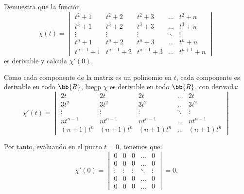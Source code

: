 \documentclass[12pt]{article}
\begin{document}
    \begin{ejercicio}
        Demuestra que la función
        \[
            \chi(t) = \begin{vmatrix}
                t^2+1 & t^2+2 & t^2+3 & \dots & t^2+n \\
                t^3+1 & t^3+2 & t^3+3 & \dots & t^3+n \\
                \vdots & \vdots & \vdots & \ddots & \vdots \\
                t^{n}+1 & t^{n}+2 & t^{n}+3 & \dots & t^{n}+n \\
                t^{n+1}+1 & t^{n+1}+2 & t^{n+1}+3 & \dots & t^{n+1}+n
            \end{vmatrix}
        \]
        es derivable y calcula $\chi'(0)$.

        Como cada componente de la matriz es un polinomio en $t$, cada componente es derivable en todo $\bb{R}$, luegp $\chi$ es derivable en todo $\bb{R}$, con derivada:
        \[
            \chi'(t) = \begin{vmatrix}
                2t & 2t & 2t & \dots & 2t \\
                3t^2 & 3t^2 & 3t^2 & \dots & 3t^2 \\
                \vdots & \vdots & \vdots & \ddots & \vdots \\
                nt^{n-1} & nt^{n-1} & nt^{n-1} & \dots & nt^{n-1} \\
                (n+1)t^{n} & (n+1)t^{n} & (n+1)t^{n} & \dots & (n+1)t^{n}
            \end{vmatrix}
        \]

        Por tanto, evaluando en el punto $t=0$, tenemos que:
        \[
            \chi'(0) = \begin{vmatrix}
                0 & 0 & 0 & \dots & 0 \\
                0 & 0 & 0 & \dots & 0 \\
                \vdots & \vdots & \vdots & \ddots & \vdots \\
                0 & 0 & 0 & \dots & 0 \\
                0 & 0 & 0 & \dots & 0
            \end{vmatrix} = 0.
        \]
    \end{ejercicio}
\end{document}
